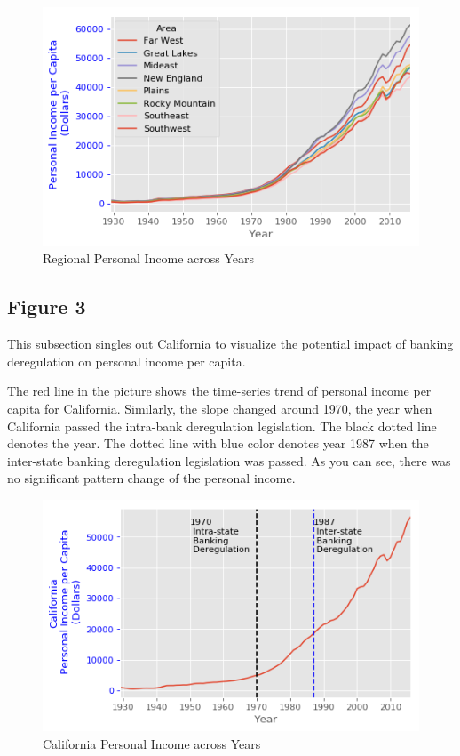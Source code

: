 \documentclass[letterpaper,12pt]{article}
\theoremstyle{definition}
\begin{document}
\begin{figure}[h]
	\centering
	\includegraphics[width=\textwidth]{figure2}
	\caption{Regional Personal Income across Years}
	\label{fig:figure2}
\end{figure}


\subsection{Figure 3}

This subsection singles out California to visualize the potential impact of banking deregulation on personal income per capita.

The red line in the picture shows the time-series trend of personal income per capita for California. Similarly, the slope changed around 1970, the year when California passed the intra-bank deregulation legislation. The black dotted line denotes the year. The dotted line with blue color denotes year 1987 when the inter-state banking deregulation legislation was passed. As you can see, there was no significant pattern change of the personal income.

\begin{figure}[h]
	\centering
	\includegraphics[width=\textwidth]{figure3}
	\caption{California Personal Income across Years}
	\label{fig:figure3}
\end{figure}
\end{document}
